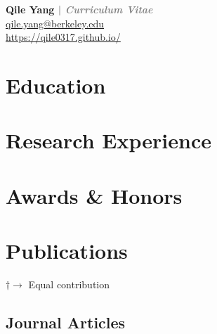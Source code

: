 \documentclass[11pt]{article} %
\newcommand{\mytitle}[4]{
  \begin{center}
    \Large\textbf{#1}\normalsize \\ %
    \href{mailto:#2}{#2} \\ %
    \href{https://#3}{#3} \\ %
    #4 %
  \end{center}
}
\newcommand{\myinput}[1]{
  
}
\newcommand{\socialicon}[2]{
  \hypersetup{hidelinks}
  \href{https://#2}{#1}
  \hypersetup{hidelinks=false}
}
\begin{document}

\mytitle{
  Qile Yang \textcolor{gray}{| \emph{Curriculum Vitae}}
}{
  qile.yang@berkeley.edu
}{
  https://qile0317.github.io/
}{
  \socialicon{\faGithub}{github.com/Qile0317}
  \socialicon{\faLinkedin}{linkedin.com/in/qile0317}
  \socialicon{\faGoogle}{scholar.google.com/citations?user=IsJeImQAAAAJ&hl=en}
  \socialicon{\faOrcid}{orcid.org/my-orcid?orcid=0009-0005-0148-2499}
}

\RaggedRight


\section*{Education}
\myinput{education.tex}

\section*{Research Experience}
\label{exp_research}
\myinput{exp_research.tex}

\section*{Awards \& Honors}
\label{awards}
\myinput{awards.tex}


\section*{Publications}
\label{pubs}

\vspace{-.75em}
\small
$\dagger \rightarrow$ Equal contribution
\normalsize


\subsection*{Journal Articles}
\label{journal-article}
\newrefcontext[labelprefix=J] %
\nocite{*} %
\printbibliography[
    type=article, %
    heading=none, %
    resetnumbers=true, %
    keyword=J %
]
\end{document}
